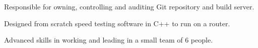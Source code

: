 \documentclass[letterpaper]{deedy-resume}
\begin{document}
\begin{minipage}[t]{0.66\textwidth}
\vspace{\topsep}
\begin{tightitemize}
\item Responsible for owning, controlling and auditing Git repository and build server.
\item Designed from scratch speed testing software in C++ to run on a router.
\item Advanced skills in working and leading in a small team of 6 people.
\end{tightitemize}
\vspace{\topsep}

\sectionspace


\end{minipage}









\lastupdated
\end{document}
